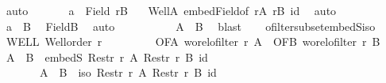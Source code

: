 \begin{isabellebody}
\ auto\isanewline
\ \ \ \ \ \isamarkupfalse%
\ {\isachardoublequoteopen}a\ {\isasymin}\ Field\ {\isacharquery}{\kern0pt}rB{\isachardoublequoteclose}\ \isamarkupfalse%
\ {\isacharasterisk}{\kern0pt}\ WellA\ embed{\isacharunderscore}{\kern0pt}Field{\isacharbrackleft}{\kern0pt}of\ {\isacharquery}{\kern0pt}rA\ {\isacharquery}{\kern0pt}rB\ id{\isacharbrackright}{\kern0pt}\ \isamarkupfalse%
\ auto\isanewline
\ \ \ \ \ \isamarkupfalse%
\ {\isachardoublequoteopen}a\ {\isasymin}\ B{\isachardoublequoteclose}\ \isamarkupfalse%
\ FieldB\ \isamarkupfalse%
\ auto\isanewline
\ \ \ \ \isacommand{{\isacharbraceright}{\kern0pt}}\isamarkupfalse%
\isanewline
\ \ \ \ \isamarkupfalse%
\ {\isachardoublequoteopen}A\ {\isasymle}\ B{\isachardoublequoteclose}\ \isamarkupfalse%
\ blast\isanewline
\ \ \isamarkupfalse%
\isanewline
{}\isamarkupfalse%
%
\endisatagproof
{\isafoldproof}%
%
\isadelimproof
\isanewline
%
\endisadelimproof
\isanewline
{}\isamarkupfalse%
\ ofilter{\isacharunderscore}{\kern0pt}subset{\isacharunderscore}{\kern0pt}embedS{\isacharunderscore}{\kern0pt}iso{\isacharcolon}{\kern0pt}\isanewline
{}\ WELL{\isacharcolon}{\kern0pt}\ {\isachardoublequoteopen}Well{\isacharunderscore}{\kern0pt}order\ r{\isachardoublequoteclose}\ \isanewline
\ \ \ \ \ \ \ \ OFA{\isacharcolon}{\kern0pt}\ {\isachardoublequoteopen}wo{\isacharunderscore}{\kern0pt}rel{\isachardot}{\kern0pt}ofilter\ r\ A{\isachardoublequoteclose}\ \ OFB{\isacharcolon}{\kern0pt}\ {\isachardoublequoteopen}wo{\isacharunderscore}{\kern0pt}rel{\isachardot}{\kern0pt}ofilter\ r\ B{\isachardoublequoteclose}\isanewline
{}\ {\isachardoublequoteopen}{\isacharparenleft}{\kern0pt}{\isacharparenleft}{\kern0pt}A\ {\isacharless}{\kern0pt}\ B{\isacharparenright}{\kern0pt}\ {\isacharequal}{\kern0pt}\ {\isacharparenleft}{\kern0pt}embedS\ {\isacharparenleft}{\kern0pt}Restr\ r\ A{\isacharparenright}{\kern0pt}\ {\isacharparenleft}{\kern0pt}Restr\ r\ B{\isacharparenright}{\kern0pt}\ id{\isacharparenright}{\kern0pt}{\isacharparenright}{\kern0pt}\ {\isasymand}\isanewline
\ \ \ \ \ \ \ {\isacharparenleft}{\kern0pt}{\isacharparenleft}{\kern0pt}A\ {\isacharequal}{\kern0pt}\ B{\isacharparenright}{\kern0pt}\ {\isacharequal}{\kern0pt}\ {\isacharparenleft}{\kern0pt}iso\ {\isacharparenleft}{\kern0pt}Restr\ r\ A{\isacharparenright}{\kern0pt}\ {\isacharparenleft}{\kern0pt}Restr\ r\ B{\isacharparenright}{\kern0pt}\ id{\isacharparenright}{\kern0pt}{\isacharparenright}{\kern0pt}{\isachardoublequoteclose}\isanewline

\end{isabellebody}
